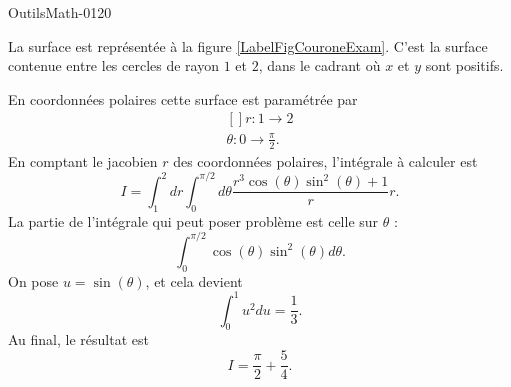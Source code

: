 
\begin{corrige}{OutilsMath-0120}

    La surface est représentée à la figure \ref{LabelFigCouroneExam}. C'est la surface contenue entre les cercles de rayon \( 1\) et \( 2\), dans le cadrant où \( x\) et \( y\) sont positifs.
    \newcommand{\CaptionFigCouroneExam}{La surface de l'exercice \ref{exoOutilsMath-0120}.}
    

    En coordonnées polaires cette surface est paramétrée par
    \begin{equation}
        \begin{aligned}[]
            r\colon 1\to 2\\
            \theta\colon 0\to \frac{ \pi }{2}.
        \end{aligned}
    \end{equation}
    En comptant le jacobien \( r\) des coordonnées polaires, l'intégrale à calculer est
    \begin{equation}
        I=\int_1^2dr\int_0^{\pi/2}d\theta\frac{ r^3\cos(\theta)\sin^2(\theta)+1 }{ r }r.
    \end{equation}
    La partie de l'intégrale qui peut poser problème est celle sur \( \theta\) :
    \begin{equation}
        \int_0^{\pi/2}\cos(\theta)\sin^2(\theta)d\theta.
    \end{equation}
    On pose \( u=\sin(\theta)\), et cela devient
    \begin{equation}
        \int_0^1u^2du=\frac{1}{ 3 }.
    \end{equation}
    Au final, le résultat est
    \begin{equation}
        I=\frac{ \pi }{2}+\frac{ 5 }{ 4 }.
    \end{equation}

\end{corrige}

